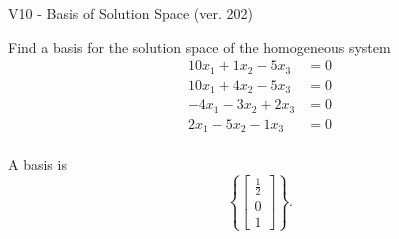 \begin{exercise}
  \begin{exerciseTitle}V10 - Basis of Solution Space (ver. 202)\end{exerciseTitle}
  \begin{exerciseStatement}
    Find a basis for the solution space of the homogeneous system 
\begin{align*}
 10 x_ 1 + 1 x_ 2 -5 x_ 3 &= 0  \\ 
  10 x_ 1 + 4 x_ 2 -5 x_ 3 &= 0  \\ 
  -4 x_ 1 -3 x_ 2 + 2 x_ 3 &= 0  \\ 
  2 x_ 1 -5 x_ 2 -1 x_ 3 &= 0  \\ 
 \end{align*}


 
  \end{exerciseStatement}

  \begin{exerciseAnswer}
   A basis is   
\[\left\{\left[\begin{array}{c}
\frac{1}{2} \\
0 \\
1
\end{array}\right]\right\}.\]

  


  \end{exerciseAnswer}
\end{exercise}
